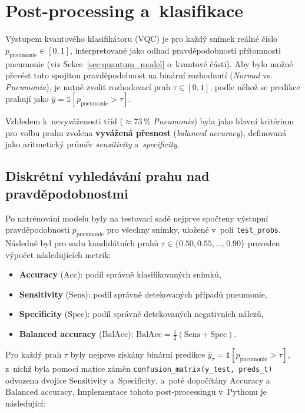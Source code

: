 \documentclass[12pt, a4paper]{report}
\begin{document}
\section{Post-processing a~klasifikace}

Výstupem kvantového klasifikátoru (VQC) je pro každý snímek reálné číslo
\(p_{\text{pneumonie}} \in [0,1]\), interpretované jako odhad pravděpodobnosti přítomnosti
pneumonie (viz Sekce~\ref{sec:quantum_model} o~kvantové části). 
Aby bylo možné převést tuto spojitou pravděpodobnost na binární rozhodnutí
(\textit{Normal} vs. \textit{Pneumonia}), je nutné zvolit rozhodovací prah
\(\tau \in [0,1]\), podle něhož se predikce prahují jako
\(\hat{y} = \mathbb{1}[p_{\text{pneumonie}} > \tau]\). 

Vzhledem k~nevyváženosti tříd (\(\approx 73\,\%\) \textit{Pneumonia}) byla jako hlavní
kritérium pro volbu prahu zvolena \textbf{vyvážená přesnost} (\textit{balanced accuracy}),
definovaná jako aritmetický průměr \textit{sensitivity} a~\textit{specificity}. 

\subsection{Diskrétní vyhledávání prahu nad pravděpodobnostmi}

Po natrénování modelu byly na testovací sadě nejprve spočteny výstupní
pravděpodobnosti \(p_{\text{pneumonie}}\) pro všechny snímky, uložené v~poli
\texttt{test\_probs}. 
Následně byl pro sadu kandidátních prahů
\(\tau \in \{0.50, 0.55, \dots, 0.90\}\) proveden výpočet následujících metrik: 

\begin{itemize}
    \item \textbf{Accuracy} (\( \text{Acc} \)): podíl správně klasifikovaných snímků,
    \item \textbf{Sensitivity} (\( \text{Sens} \)): podíl správně detekovaných případů pneumonie,
    \item \textbf{Specificity} (\( \text{Spec} \)): podíl správně detekovaných negativních nálezů,
    \item \textbf{Balanced accuracy} (\( \text{BalAcc} \)): 
    \(\text{BalAcc} = \tfrac{1}{2}(\text{Sens} + \text{Spec})\). 
\end{itemize}

Pro každý prah \(\tau\) byly nejprve získány binární predikce
\(\hat{y}_\tau = \mathbb{1}[p_{\text{pneumonie}} > \tau]\), z~nichž byla pomocí matice
záměn \texttt{confusion\_matrix(y\_test, preds\_t)} odvozena dvojice
\(\text{Sensitivity}\) a~\(\text{Specificity}\), a~poté dopočítány
\(\text{Accuracy}\) a~\(\text{Balanced accuracy}\). 
Implementace tohoto post-processingu v~Pythonu je následující:
\end{document}
